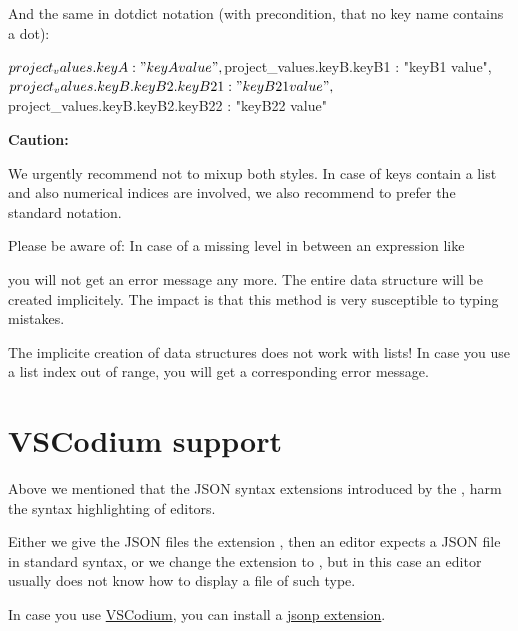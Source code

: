 \vspace{2ex}

And the same in dotdict notation (with precondition, that no key name contains a dot):

\begin{pythoncode}
{
   ${project_values.keyA} : "keyA value",
   ${project_values.keyB.keyB1} : "keyB1 value",
   ${project_values.keyB.keyB2.keyB21} : "keyB21 value",
   ${project_values.keyB.keyB2.keyB22} : "keyB22 value"
}
\end{pythoncode}

\vspace{2ex}

\textbf{Caution:}

We urgently recommend not to mixup both styles. In case of keys contain a list and also numerical indices are involved, we also recommend
to prefer the standard notation. 

Please be aware of: In case of a missing level in between an expression like 


you will not get an error message any more. The entire data structure will be created implicitely. The impact is that this method
is very susceptible to typing mistakes.

The implicite creation of data structures does not work with lists! In case you use a list index out of range, you will get
a corresponding error message.



\newpage

\section{VSCodium support}

Above we mentioned that the JSON syntax extensions introduced by the \pkg, harm the syntax highlighting of editors.

Either we give the JSON files the extension , then an editor expects a JSON file in standard syntax,
or we change the extension to , but in this case an editor usually does not know how to display a file of such type.

In case you use \href{https://vscodium.com/}{VSCodium}, you can install a
\href{https://github.com/test-fullautomation/vscode-jsonp}{jsonp extension}. 

